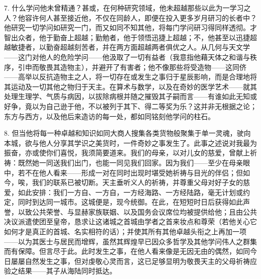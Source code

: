 7. 什么学问他未曾精通？甚或，在何种研究领域，他未超越那些以此为一学习之人？他容许何人甚至接近他，不仅在同龄人，即便在投入更多岁月研习的长者中？他研究一切学问如研究一门，而又如同不知其他，将每门学问研习得同样透彻。才智出众者，他于勤奋上超越；勤勉者，他于领悟迅捷上超越；不，他甚至以迅捷超越敏捷者，以勤奋超越刻苦者，并在两方面超越两者俱优之人。从几何与天文学——这门对他人的危险学问——他汲取了一切有益者（我意指他藉天体之和谐与秩序，引申而敬畏其造物主），并避开了有害者；他不像那些将受造物——这同侪——高举以反抗造物主之人，将一切存在或发生之事归于星辰影响，而是合理地将其运动及一切其他之物归于天主。在算术与数学，以及在奇妙的医学艺术——就其处理生理学、气质与病因，以拔除病根并随之摧毁其子嗣而言——有谁如此无知或好争，竟以为自己逊于他，不以被列于其下、得二等奖为乐？这并非无根据之论；东方与西方，以及他后来造访的每一处，都如同铭刻他学问的柱石。\par

8. 但当他将每一种卓越和知识如同大商人搜集各类货物般聚集于单一灵魂，驶向本城，欲与他人分享其学识之美货时，一件奇妙之事发生了。此事之述说对我最为振奋，亦或使你们喜悦，我须简要道来。我们的母亲，以对儿女的慈爱，曾献上祈祷：既然她一同送我们出门，也能一同见我们回家。因为我们——至少在母亲眼中，若不在他人看来——形成一对在同时出现时堪受她祈祷与目光的伴侣；但如今，唉，我们的联系已被切断。天主垂听义人的祈祷，并尊重父母对好子女的慈爱，如此安排：我们一方自、一方自，一方经海路、一方经陆路，毫无计划或约定，同时到达同一城市。这城便是，现今统御。在此，在短短时日后获得如此声誉，以致公共荣誉、与显赫家族联姻、以及国务会议席位均被提供给他；且由公共决议派遣使团至皇帝，恳求让这诸城之首城由学者之首来妆点和尊荣（若他关心它如何才是真正的首城、名实相符的话）；并使其所有其他卓越头衔之上再加一项——以为其医士与居民而增辉，虽然其辉煌早已因众多哲学及其他学问伟人之群集而有保障。但言尽于此。此时发生之事，在他人看来像是无因无由的偶然，如同今日屡屡自然发生之事，但对虔敬心灵而言，这已足够显明为敬畏天主的父母祈祷应验之结果——其子从海陆同时抵达。\par

